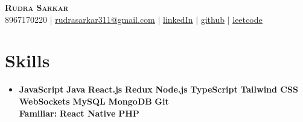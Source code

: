 \documentclass[letterpaper,11pt]{article}
\makeatletter
\newcommand{\resumeItem}[1]{
  \item\small{
    {#1 \vspace{-2pt}}
  }
}
\newcommand{\resumeSubheading}[4]{
  \vspace{-2pt}\item
    \begin{tabular*}{0.97\textwidth}[t]{l@{\extracolsep{\fill}}r}
      \textbf{#1} & #2 \\
      \textit{\small#3} & \textit{\small #4} \\
    \end{tabular*}\vspace{-7pt}
}
\newcommand{\resumeSubHeadingListStart}{\begin{itemize}[leftmargin=0.15in, label={}]}
\newcommand{\resumeItemListStart}{\begin{itemize}}
\newcommand{\resumeItemListEnd}{\end{itemize}\vspace{-5pt}}
\makeatother
\begin{document}

\begin{center}
    \textbf{\Huge \scshape Rudra Sarkar} \\ \vspace{5pt}
    \small 8967170220 $|$ \href{mailto:rudrasarkar311@gmail.com}{\underline{rudrasarkar311@gmail.com}}  $|$
    \href{https://www.linkedin.com/in/rudra-sarkar-853385225}{\underline{linkedIn}} $|$
    \href{https://github.com/RudraSarkar5}{\underline{github}}  $|$
    \href{https://leetcode.com/Rudra_sarkar5}{\underline{leetcode}}
\end{center}


\section{Skills}
\begin{itemize}
    \item \textbf{JavaScript} \textbullet{} \textbf{Java} \textbullet{} \textbf{React.js} \textbullet{} \textbf{Redux} \textbullet{} \textbf{Node.js} \textbullet{} \textbf{TypeScript} \textbullet{} \textbf{Tailwind CSS} \textbullet{} \textbf{WebSockets} \textbullet{} \textbf{MySQL} \textbullet{} \textbf{MongoDB} \textbullet{} \textbf{Git} \\
   \textbf{Familiar:} \textbullet{} \textbf{React Native} \textbullet{} \textbf{PHP}
\end{itemize}











      
\end{document}
